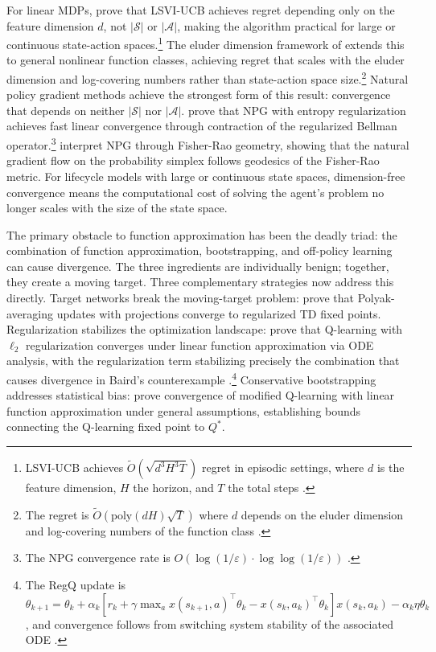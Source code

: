 For linear MDPs, \citet{jin2020} prove that LSVI-UCB achieves regret depending only on the feature dimension $d$, not $|\mathcal{S}|$ or $|\mathcal{A}|$, making the algorithm practical for large or continuous state-action spaces.\footnote{LSVI-UCB achieves $\tilde{O}(\sqrt{d^3 H^3 T})$ regret in episodic settings, where $d$ is the feature dimension, $H$ the horizon, and $T$ the total steps \citep{jin2020}.} The eluder dimension framework of \citet{wang2020eluder} extends this to general nonlinear function classes, achieving regret that scales with the eluder dimension and log-covering numbers rather than state-action space size.\footnote{The regret is $\tilde{O}(\mathrm{poly}(dH)\sqrt{T})$ where $d$ depends on the eluder dimension and log-covering numbers of the function class \citep{wang2020eluder}.} Natural policy gradient methods achieve the strongest form of this result: convergence that depends on neither $|\mathcal{S}|$ nor $|\mathcal{A}|$. \citet{cen2022fast} prove that NPG with entropy regularization achieves fast linear convergence through contraction of the regularized Bellman operator.\footnote{The NPG convergence rate is $O(\log(1/\varepsilon) \cdot \log\log(1/\varepsilon))$ \citep{cen2022fast}.} \citet{muller2024npg} interpret NPG through Fisher-Rao geometry, showing that the natural gradient flow on the probability simplex follows geodesics of the Fisher-Rao metric. For lifecycle models with large or continuous state spaces, dimension-free convergence means the computational cost of solving the agent's problem no longer scales with the size of the state space.

The primary obstacle to function approximation has been the deadly triad: the combination of function approximation, bootstrapping, and off-policy learning can cause divergence. The three ingredients are individually benign; together, they create a moving target. Three complementary strategies now address this directly. Target networks break the moving-target problem: \citet{zhang2021target} prove that Polyak-averaging updates with projections converge to regularized TD fixed points. Regularization stabilizes the optimization landscape: \citet{lim2024regularized} prove that Q-learning with $\ell_2$ regularization converges under linear function approximation via ODE analysis, with the regularization term stabilizing precisely the combination that causes divergence in Baird's counterexample \citep{Baird1995}.\footnote{The RegQ update is $\theta_{k+1} = \theta_k + \alpha_k [r_k + \gamma \max_a x(s_{k+1}, a)^\top \theta_k - x(s_k, a_k)^\top \theta_k] x(s_k, a_k) - \alpha_k \eta \theta_k$, and convergence follows from switching system stability of the associated ODE \citep{lim2024regularized}.} Conservative bootstrapping addresses statistical bias: \citet{carvalho2020convergence} prove convergence of modified Q-learning with linear function approximation under general assumptions, establishing bounds connecting the Q-learning fixed point to $Q^*$.

